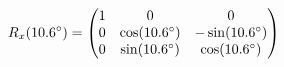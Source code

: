 \documentclass[preview]{standalone}
\begin{document}
\begin{align*}
\special{dvisvgm:raw <g id='unique000'>}R_x(10.6^\circ) = \begin{pmatrix} 1 & 0 & 0 \\ 0 & \cos(10.6^\circ) & -\sin(10.6^\circ) \\ 0 & \sin(10.6^\circ) & \cos(10.6^\circ) \end{pmatrix}\special{dvisvgm:raw </g>}
\end{align*}
\end{document}
